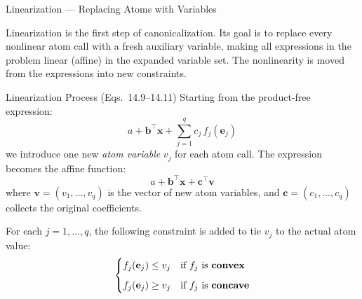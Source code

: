 \documentclass[aspectratio=169,10pt]{beamer}
\begin{document}
\begin{frame}[allowframebreaks]{Linearization --- Replacing Atoms with Variables}

  Linearization is the first step of canonicalization.  Its goal is to
  replace every nonlinear atom call with a fresh auxiliary variable,
  making all expressions in the problem linear (affine) in the expanded
  variable set.  The nonlinearity is moved from the expressions into
  new constraints.

  \begin{block}{Linearization Process (Eqs.\ 14.9--14.11)}
    Starting from the product-free expression:
    \[
      a + \mathbf{b}^{\top}\mathbf{x} +
      \sum_{j=1}^{q} c_j\, f_j(\mathbf{e}_j)
    \]
    we introduce one new \emph{atom variable} $v_j$ for each atom call.
    The expression becomes the affine function:
    \[
      a + \mathbf{b}^{\top}\mathbf{x} + \mathbf{c}^{\top}\mathbf{v}
    \]
    where $\mathbf{v} = (v_1, \ldots, v_q)$ is the vector of new atom
    variables, and $\mathbf{c} = (c_1, \ldots, c_q)$ collects the
    original coefficients.

    For each $j = 1, \ldots, q$, the following constraint is added
    to tie $v_j$ to the actual atom value:
    \[
      \begin{cases}
        f_j(\mathbf{e}_j) \leq v_j
          & \text{if } f_j \text{ is \textbf{convex}}\\[6pt]
        f_j(\mathbf{e}_j) \geq v_j
          & \text{if } f_j \text{ is \textbf{concave}}
      \end{cases}
    \]
  \end{block}


\end{frame}
\end{document}

